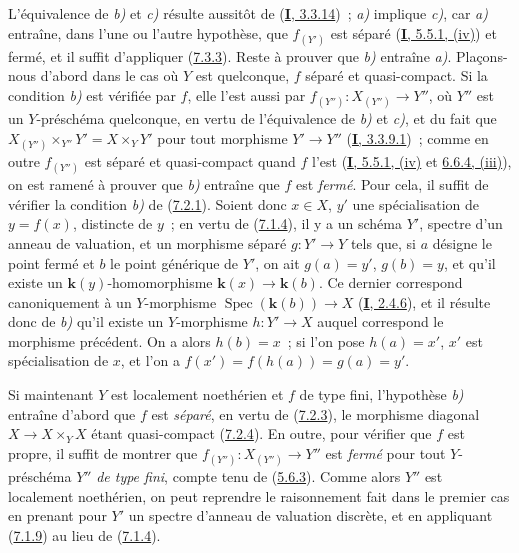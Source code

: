 L'équivalence de \emph{b)} et \emph{c)} résulte aussitôt de
(\hyperref[I.3.3.14-fr]{\textbf{I}, 3.3.14})~; \emph{a)} implique \emph{c)}, car \emph{a)} entraîne, dans
l'une ou l'autre hypothèse, que $f_{(Y')}$ est séparé
(\hyperref[I.5.5.1-fr]{\textbf{I}, 5.5.1, (iv)}) et fermé, et il suffit d'appliquer
(\hyperref[II.7.3.3-fr]{7.3.3}). Reste à prouver que \emph{b)} entraîne \emph{a)}.
Plaçons-nous d'abord dans le cas où $Y$ est quelconque, $f$ séparé et
quasi-compact. Si la condition \emph{b)} est vérifiée par $f$, elle l'est aussi par
$f_{(Y'')}:X_{(Y'')}\to Y''$, où $Y''$ est un $Y$-préschéma quelconque, en
vertu de l'équivalence de \emph{b)} et \emph{c)}, et du fait que
$X_{(Y'')}\times_{Y''}Y'=X\times_YY'$ pour tout morphisme $Y'\to Y''$
(\hyperref[I.3.3.9.1-fr]{\textbf{I}, 3.3.9.1})~; comme en outre $f_{(Y'')}$ est séparé
et quasi-compact quand $f$ l'est
(\hyperref[I.5.5.1-fr]{\textbf{I}, 5.5.1, (iv)} et
\hyperref[I.6.6.4-fr]{6.6.4, (iii)}), on est ramené à prouver que \emph{b)} entraîne
que $f$ est \emph{fermé}. Pour cela, il suffit de vérifier la condition \emph{b)} de
(\hyperref[II.7.2.1-fr]{7.2.1}). Soient donc $x\in X$, $y'$ une spécialisation
de $y=f(x)$, distincte de $y$~; en vertu de
(\hyperref[II.7.1.4-fr]{7.1.4}), il y a un schéma $Y'$, spectre d'un anneau de
valuation, et un morphisme séparé $g:Y'\to Y$ tels que, si $a$ désigne le point
fermé et $b$ le point générique de $Y'$, on ait $g(a)=y'$, $g(b)=y$, et qu'il
existe un $\boldsymbol{k}(y)$-homomorphisme $\boldsymbol{k}(x)\to \boldsymbol{k}(b)$. Ce dernier correspond
canoniquement à un $Y$-morphisme $\operatorname{Spec}(\boldsymbol{k}(b))\to X$
(\hyperref[I.2.4.6-fr]{\textbf{I}, 2.4.6}), et il résulte donc de \emph{b)} qu'il existe un
$Y$-morphisme $h:Y'\to X$ auquel correspond le morphisme précédent. On a
alors $h(b)=x$~; si l'on pose $h(a)=x'$, $x'$ est spécialisation de $x$, et
l'on a $f(x')=f(h(a))=g(a)=y'$.

Si maintenant $Y$ est localement noethérien et $f$ de type fini, l'hypothèse
\emph{b)} entraîne d'abord que $f$ est \emph{séparé}, en vertu de
(\hyperref[II.7.2.3-fr]{7.2.3}), le morphisme diagonal $X\to X\times_YX$
étant quasi-compact (\hyperref[II.7.2.4-fr]{7.2.4}). En outre, pour vérifier
que $f$ est propre, il suffit de montrer que $f_{(Y'')}:X_{(Y'')}\to Y''$ est
\emph{fermé} pour tout $Y$-préschéma $Y''$ \emph{de type fini}, compte tenu de
(\hyperref[II.5.6.3-fr]{5.6.3}). Comme alors $Y''$ est localement noethérien,
on peut reprendre le raisonnement fait dans le premier cas en prenant pour
$Y'$ un spectre d'anneau de valuation discrète, et en appliquant
(\hyperref[II.7.1.9-fr]{7.1.9}) au lieu de
(\hyperref[II.7.1.4-fr]{7.1.4}).

